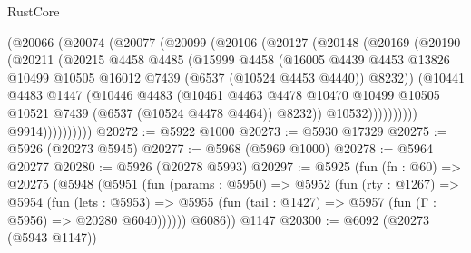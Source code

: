 \begin{lexlean}{RustCore}
\begin{coremodule}
                    (@20066
                      (@20074
                        (@20077
                          (@20099
                            (@20106
                              (@20127
                                (@20148
                                  (@20169
                                    (@20190
                                      (@20211
                                        (@20215
                                          @4458
                                          @4485
                                          (@15999
                                            @4458
                                            (@16005
                                              @4439
                                              @4453
                                              @13826
                                              @10499
                                              @10505
                                              @16012
                                              @7439
                                              (@6537 (@10524 @4453 @4440))
                                              @8232))
                                          (@10441
                                            @4483
                                            @1447
                                            (@10446
                                              @4483
                                              (@10461
                                                @4463
                                                @4478
                                                @10470
                                                @10499
                                                @10505
                                                @10521
                                                @7439
                                                (@6537 (@10524 @4478 @4464))
                                                @8232))
                                            @10532))))))))))
                        @9914))))))))))
@20272 := @5922 @1000
@20273 := @5930 @17329
@20275 := @5926 (@20273 @5945)
@20277 := @5968 (@5969 @1000)
@20278 := @5964 @20277
@20280 := @5926 (@20278 @5993)
@20297 := @5925
    (fun (fn : @60) =>
    @20275
      (@5948
        (@5951
          (fun (params : @5950) =>
          @5952
            (fun (rty : @1267) =>
            @5954
              (fun (lets : @5953) =>
              @5955 (fun (tail : @1427) => @5957 (fun (Γ : @5956) => @20280 @6040))))))
        @6086))
    @1147
@20300 := @6092 (@20273 (@5943 @1147))

\end{coremodule}
\end{lexlean}
